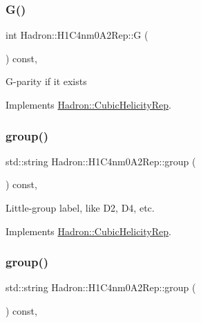 \subsubsection{\texorpdfstring{G()}{G()}\hspace{0.1cm}{\footnotesize\ttfamily [3/3]}}
{\footnotesize\ttfamily int Hadron\+::\+H1\+C4nm0\+A2\+Rep\+::G (\begin{DoxyParamCaption}{ }\end{DoxyParamCaption}) const\hspace{0.3cm}{\ttfamily [inline]}, {\ttfamily [virtual]}}

G-\/parity if it exists 

Implements \mbox{\hyperlink{structHadron_1_1CubicHelicityRep_a50689f42be1e6170aa8cf6ad0597018b}{Hadron\+::\+Cubic\+Helicity\+Rep}}.

\mbox{\label{structHadron_1_1H1C4nm0A2Rep_a3033103082fad0b1572469c929fde9bb}} 
\subsubsection{\texorpdfstring{group()}{group()}\hspace{0.1cm}{\footnotesize\ttfamily [1/5]}}
{\footnotesize\ttfamily std\+::string Hadron\+::\+H1\+C4nm0\+A2\+Rep\+::group (\begin{DoxyParamCaption}{ }\end{DoxyParamCaption}) const\hspace{0.3cm}{\ttfamily [inline]}, {\ttfamily [virtual]}}

Little-\/group label, like D2, D4, etc. 

Implements \mbox{\hyperlink{structHadron_1_1CubicHelicityRep_a101a7d76cd8ccdad0f272db44b766113}{Hadron\+::\+Cubic\+Helicity\+Rep}}.

\mbox{\label{structHadron_1_1H1C4nm0A2Rep_a3033103082fad0b1572469c929fde9bb}} 
\subsubsection{\texorpdfstring{group()}{group()}\hspace{0.1cm}{\footnotesize\ttfamily [2/5]}}
{\footnotesize\ttfamily std\+::string Hadron\+::\+H1\+C4nm0\+A2\+Rep\+::group (\begin{DoxyParamCaption}{ }\end{DoxyParamCaption}) const\hspace{0.3cm}{\ttfamily [inline]}, {\ttfamily [virtual]}}


